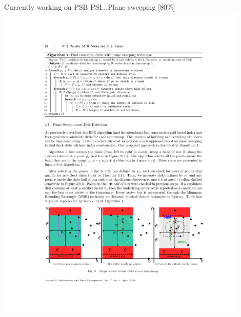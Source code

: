 \documentclass{beamer}
\begin{document}
\begin{frame}{Currently working on PSB \textrightarrow PSI...}{Plane sweeping [80\%]}
    \centering
    \includegraphics[trim=3.5cm 4.25cm 3.15cm 18cm, clip, width=0.9\textwidth]{figures/sweeping}
\end{frame}
\end{document}
